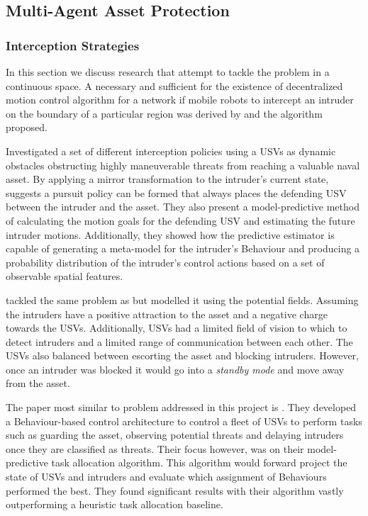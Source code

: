 \documentclass[bsc,frontabs,twoside,singlespacing,parskip,deptreport]{infthesis}     %
\begin{document}
\subsection{Multi-Agent Asset Protection}
\subsubsection{Interception Strategies}
In this section we discuss research that attempt to tackle the problem in a continuous space. A necessary and sufficient for the existence of decentralized motion control algorithm for a network if mobile robots to intercept an intruder on the boundary of a particular region was derived by \citet{marzoughi2018collision} and the algorithm proposed. 

\citet{gupta2015block} Investigated a set of different interception policies using a USVs as dynamic obstacles obstructing highly maneuverable threats from reaching a valuable naval asset. By applying a mirror transformation to the intruder's current state, \cite{gupta2015block} suggests a pursuit policy can be formed that always places the defending USV between the intruder and the asset. They also present a model-predictive method of calculating the motion goals for the defending USV and estimating the future intruder motions. Additionally, they showed how the predictive estimator is capable of generating a meta-model for the intruder's Behaviour and producing a probability distribution of the intruder's control actions based on a set of observable spatial features. 

\citet{moundegue2017fields} tackled the same problem as \cite{gupta2015block} but modelled it using the potential fields. Assuming the intruders have a positive attraction to the asset and a negative charge towards the USVs. Additionally, USVs had a limited field of vision to which to detect intruders and a limited range of communication between each other. The USVs also balanced between escorting the asset and blocking intruders. However, once an intruder was blocked it would go into a \emph{standby mode} and move away from the asset.

The paper most similar to problem addressed in this project is \citep{raboin2013model}. They developed a Behaviour-based control architecture to control a fleet of USVs to perform tasks such as guarding the asset, observing potential threats and delaying intruders once they are classified as threats. Their focus however, was on their model-predictive task allocation algorithm. This algorithm would forward project the state of USVs and intruders and evaluate which assignment of Behaviours performed the best. They found significant results with their algorithm vastly outperforming a heuristic task allocation baseline. 
\end{document}
